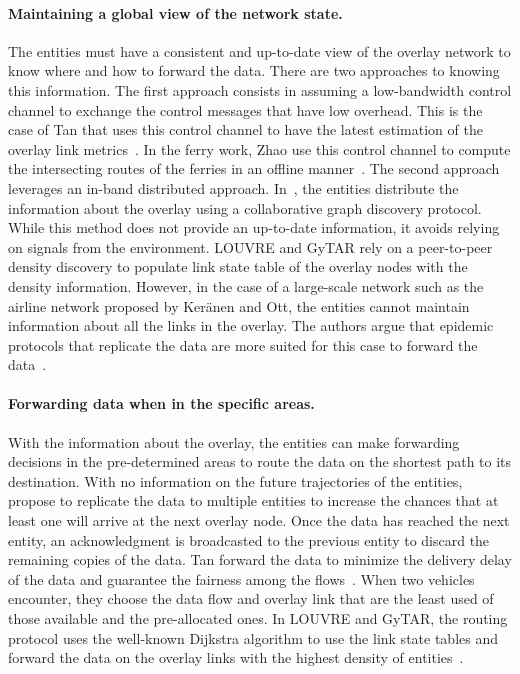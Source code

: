 \paragraph{Maintaining a global view of the network state.}
The entities must have a consistent and up-to-date view of the overlay network to know where and how to forward the data. There are two approaches to knowing this information. The first approach consists in assuming a low-bandwidth control channel to exchange the control messages that have low overhead. This is the case of Tan \etal that uses this control channel to have the latest estimation of the overlay link metrics~\cite{tan2014vehicular}. In the ferry work, Zhao \etal use this control channel to compute the intersecting routes of the ferries in an offline manner~\cite{zhao2005controlling}. The second approach leverages an in-band distributed approach. In~\cite{sarafijanovic2006island}, the entities distribute the information about the overlay using a collaborative graph discovery protocol. While this method does not provide an up-to-date information, it avoids relying on signals from the environment. LOUVRE and GyTAR rely on a peer-to-peer density discovery to populate link state table of the overlay nodes with the density information. However, in the case of a large-scale network such as the airline network proposed by Ker{\"a}nen and Ott, the entities cannot maintain information about all the links in the overlay. The authors argue that epidemic protocols that replicate the data are more suited for this case to forward the data~\cite{keranen2009dtn}.

\paragraph{Forwarding data when in the specific areas.}
With the information about the overlay, the entities can make forwarding decisions in the pre-determined areas to route the data on the shortest path to its destination. With no information on the future trajectories of the entities, \cite{sarafijanovic2006island} propose to replicate the data to multiple entities to increase the chances that at least one will arrive at the next overlay node. Once the data has reached the next entity, an acknowledgment is broadcasted to the previous entity to discard the remaining copies of the data. Tan \etal forward the data to minimize the delivery delay of the data and guarantee the fairness among the flows~\cite{tan2014vehicular}. When two vehicles encounter, they choose the data flow and overlay link that are the least used of those available and the pre-allocated ones. In LOUVRE and GyTAR, the routing protocol uses the well-known Dijkstra algorithm to use the link state tables and forward the data on the overlay links with the highest density of entities~\cite{lee2008louvre,jerbi2009towards}.

